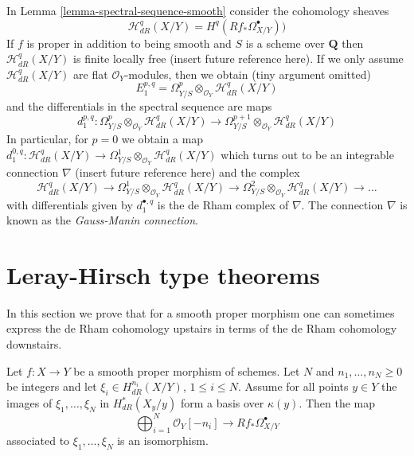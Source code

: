 \begin{remark}
\label{remark-gauss-manin}
In Lemma \ref{lemma-spectral-sequence-smooth} consider the cohomology sheaves
$$
\mathcal{H}^q_{dR}(X/Y) = H^q(Rf_*\Omega^\bullet_{X/Y}))
$$
If $f$ is proper in addition to being smooth and $S$ is a scheme over
$\mathbf{Q}$ then $\mathcal{H}^q_{dR}(X/Y)$ is finite locally free (insert
future reference here). If we only assume $\mathcal{H}^q_{dR}(X/Y)$
are flat $\mathcal{O}_Y$-modules, then we obtain (tiny argument omitted)
$$
E_1^{p, q} =
\Omega^p_{Y/S} \otimes_{\mathcal{O}_Y} \mathcal{H}^q_{dR}(X/Y)
$$
and the differentials in the spectral sequence are maps
$$
d_1^{p, q} :
\Omega^p_{Y/S} \otimes_{\mathcal{O}_Y} \mathcal{H}^q_{dR}(X/Y)
\longrightarrow
\Omega^{p + 1}_{Y/S} \otimes_{\mathcal{O}_Y} \mathcal{H}^q_{dR}(X/Y)
$$
In particular, for $p = 0$ we obtain a map
$d_1^{0, q} : \mathcal{H}^q_{dR}(X/Y) \to
\Omega^1_{Y/S} \otimes_{\mathcal{O}_Y} \mathcal{H}^q_{dR}(X/Y)$
which turns out to be an integrable connection
$\nabla$ (insert future reference here)
and the complex
$$
\mathcal{H}^q_{dR}(X/Y) \to
\Omega^1_{Y/S} \otimes_{\mathcal{O}_Y} \mathcal{H}^q_{dR}(X/Y) \to
\Omega^2_{Y/S} \otimes_{\mathcal{O}_Y} \mathcal{H}^q_{dR}(X/Y) \to \ldots
$$
with differentials given by $d_1^{\bullet, q}$
is the de Rham complex of $\nabla$.
The connection $\nabla$ is known as the {\it Gauss-Manin connection}.
\end{remark}






\section{Leray-Hirsch type theorems}
\label{section-leray-hirsch}

\noindent
In this section we prove that for a smooth proper morphism one
can sometimes express the de Rham cohomology upstairs in terms
of the de Rham cohomology downstairs.

\begin{lemma}
\label{lemma-relative-global-generation-on-fibres}
Let $f : X \to Y$ be a smooth proper morphism of schemes.
Let $N$ and $n_1, \ldots, n_N \geq 0$ be integers and let
$\xi_i \in H^{n_i}_{dR}(X/Y)$, $1 \leq i \leq N$.
Assume for all points $y \in Y$ the images of $\xi_1, \ldots, \xi_N$
in $H^*_{dR}(X_y/y)$ form a basis over $\kappa(y)$. Then the map
$$
\bigoplus\nolimits_{i = 1}^N \mathcal{O}_Y[-n_i]
\longrightarrow
Rf_*\Omega^\bullet_{X/Y}
$$
associated to $\xi_1, \ldots, \xi_N$ is an isomorphism.
\end{lemma}

